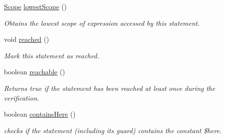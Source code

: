 \begin{DoxyCompactItemize}
\item 
\hyperlink{interfaceedu_1_1udel_1_1cis_1_1vsl_1_1civl_1_1model_1_1IF_1_1Scope}{Scope} \hyperlink{classedu_1_1udel_1_1cis_1_1vsl_1_1civl_1_1model_1_1common_1_1statement_1_1CommonStatement_a461d80a11f0127415f6fd9c88bb765e3}{lowest\+Scope} ()
\begin{DoxyCompactList}\small\item\em Obtains the lowest scope of expression accessed by this statement. \end{DoxyCompactList}\item 
\hypertarget{classedu_1_1udel_1_1cis_1_1vsl_1_1civl_1_1model_1_1common_1_1statement_1_1CommonStatement_a3f0974ff783157b8ef3981742b58438a}{}void \hyperlink{classedu_1_1udel_1_1cis_1_1vsl_1_1civl_1_1model_1_1common_1_1statement_1_1CommonStatement_a3f0974ff783157b8ef3981742b58438a}{reached} ()\label{classedu_1_1udel_1_1cis_1_1vsl_1_1civl_1_1model_1_1common_1_1statement_1_1CommonStatement_a3f0974ff783157b8ef3981742b58438a}

\begin{DoxyCompactList}\small\item\em Mark this statement as reached. \end{DoxyCompactList}\item 
boolean \hyperlink{classedu_1_1udel_1_1cis_1_1vsl_1_1civl_1_1model_1_1common_1_1statement_1_1CommonStatement_ac426607515a1d6807dcc41371a04bd73}{reachable} ()
\begin{DoxyCompactList}\small\item\em Returns true if the statement has been reached at least once during the verification. \end{DoxyCompactList}\item 
boolean \hyperlink{classedu_1_1udel_1_1cis_1_1vsl_1_1civl_1_1model_1_1common_1_1statement_1_1CommonStatement_a34c65cda37f56ac2a602dae638fa2f07}{contains\+Here} ()
\begin{DoxyCompactList}\small\item\em checks if the statement (including its guard) contains the constant \$here. \end{DoxyCompactList}\end{DoxyCompactItemize}
